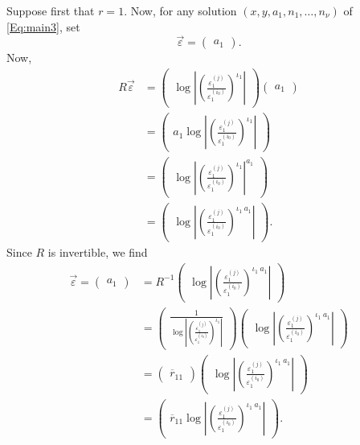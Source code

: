 Suppose first that $r = 1$. Now, for any solution $(x,y, a_1, n_1, \dots, n_{\nu})$ of \eqref{Eq:main3}, set
\[\vec{\varepsilon} = \begin{pmatrix} a_1 \end{pmatrix}.\]
Now, 
\begin{align*}
R\vec{\varepsilon}
	& = \begin{pmatrix}
		\log\left|\left(\frac{\varepsilon_1^{(j)}}{\varepsilon_1^{(i_0)}}\right)^{\iota_1}\right| \end{pmatrix}
		\begin{pmatrix} a_1\end{pmatrix}\\
	& = \begin{pmatrix} 
		a_1\log\left|\left(\frac{\varepsilon_1^{(j)}}{\varepsilon_1^{(i_0)}}\right)^{\iota_1}\right| \end{pmatrix}\\
	& = \begin{pmatrix} 
		\log\left|\left(\frac{\varepsilon_1^{(j)}}{\varepsilon_1^{(i_0)}}\right)^{\iota_1}\right|^{a_1} 	 		\end{pmatrix}\\
	& = \begin{pmatrix} 
		\log\left|\left(\frac{\varepsilon_1^{(j)}}{\varepsilon_1^{(i_0)}}\right)^{\iota_1 \ a_1}\right| 		 \end{pmatrix}.
\end{align*}
Since $R$ is invertible, we find
\begin{align*}
\vec{\varepsilon} = \begin{pmatrix} a_1\end{pmatrix} 
& =  R^{-1} \begin{pmatrix} \log\left|\left(\frac{\varepsilon_1^{(j)}}{\varepsilon_1^{(i_0)}}\right)^{\iota_1 \ 		a_1}\right| \end{pmatrix}\\
& = \begin{pmatrix} \frac{1}{\log\left|\left(\frac{\varepsilon_1^{(j)}}{\varepsilon_1^{(i_0)}}\right)^{\iota_1}\right|}	\end{pmatrix}
	\begin{pmatrix} \log\left|\left(\frac{\varepsilon_1^{(j)}}{\varepsilon_1^{(i_0)}}\right)^{\iota_1 \ a_1}\right| 	\end{pmatrix}\\
& = \begin{pmatrix} \overline{r}_{11} \end{pmatrix}\begin{pmatrix} \log\left|\left(\frac{\varepsilon_1^{(j)}}		{\varepsilon_1^{(i_0)}}\right)^{\iota_1 \ a_1}\right| \end{pmatrix}\\
& = \begin{pmatrix} \overline{r}_{11}\log\left|\left(\frac{\varepsilon_1^{(j)}}{\varepsilon_1^{(i_0)}}\right)^{\iota_1 \ 	a_1}\right|\end{pmatrix}.
\end{align*}

